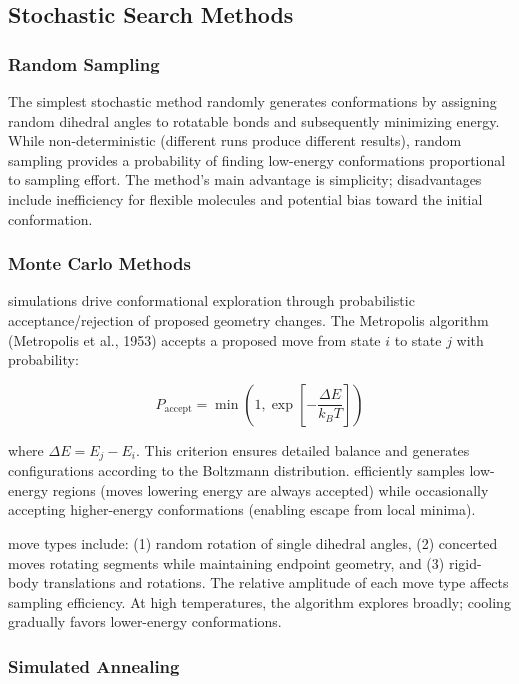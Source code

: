 \documentclass[12pt]{article}
\begin{document}
\subsection{Stochastic Search Methods}

\subsubsection{Random Sampling}

The simplest stochastic method randomly generates conformations by assigning random dihedral angles to rotatable bonds and subsequently minimizing energy. While non-deterministic (different runs produce different results), random sampling provides a probability of finding low-energy conformations proportional to sampling effort. The method's main advantage is simplicity; disadvantages include inefficiency for flexible molecules and potential bias toward the initial conformation.

\subsubsection{Monte Carlo Methods}

\MC simulations drive conformational exploration through probabilistic acceptance/rejection of proposed geometry changes. The Metropolis \MC algorithm (Metropolis et al., 1953) accepts a proposed move from state $i$ to state $j$ with probability:

\begin{equation}
P_{\text{accept}} = \min\left(1, \exp\left[-\frac{\Delta E}{k_B T}\right]\right)
\label{eq:metropolis}
\end{equation}

where $\Delta E = E_j - E_i$. This criterion ensures detailed balance and generates configurations according to the Boltzmann distribution. \MC efficiently samples low-energy regions (moves lowering energy are always accepted) while occasionally accepting higher-energy conformations (enabling escape from local minima).

\MC move types include: (1) random rotation of single dihedral angles, (2) concerted moves rotating segments while maintaining endpoint geometry, and (3) rigid-body translations and rotations. The relative amplitude of each move type affects sampling efficiency. At high temperatures, the algorithm explores broadly; cooling gradually favors lower-energy conformations.

\subsubsection{Simulated Annealing}
\end{document}
